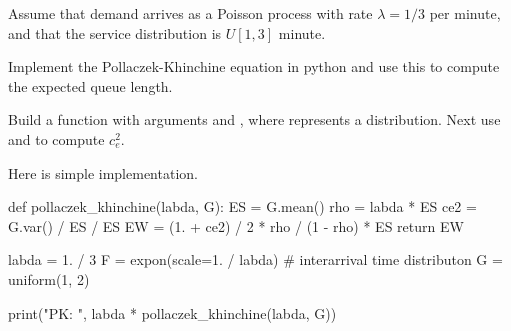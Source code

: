 Assume that demand arrives as a Poisson process with rate $\lambda=1/3$ per minute, and that the service distribution is $U[1,3]$ minute.


\begin{exercise}\label{ex:5}
  Implement the Pollaczek-Khinchine equation in python and use this to compute the expected queue length.


\begin{hint}
  Build a function with arguments  and , where  represents a distribution.
  Next use  and  to compute $c_e^2$.
\end{hint}
\begin{solution}
Here is simple implementation.
    \begin{pyverbatim}
def pollaczek_khinchine(labda, G):
    ES = G.mean()
    rho = labda * ES
    ce2 = G.var() / ES / ES
    EW = (1. + ce2) / 2 * rho / (1 - rho) * ES
    return EW


labda = 1. / 3
F = expon(scale=1. / labda)  # interarrival time distributon
G = uniform(1, 2)

print("PK: ", labda * pollaczek_khinchine(labda, G))
\end{pyverbatim}
  \end{solution}
\end{exercise}

